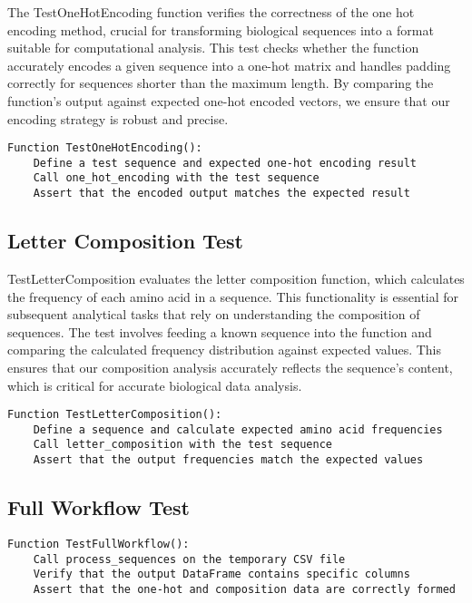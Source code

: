 \documentclass[12pt]{article}
\begin{document}
The TestOneHotEncoding function verifies the correctness of the one hot encoding method, crucial for transforming biological sequences into a format suitable for computational analysis. This test checks whether the function accurately encodes a given sequence into a one-hot matrix and handles padding correctly for sequences shorter than the maximum length. By comparing the function’s output against expected one-hot encoded vectors, we ensure that our encoding strategy is robust and precise.

\begin{lstlisting}[caption=Pseudocode: Test for One-Hot Encoding Function]
Function TestOneHotEncoding():
    Define a test sequence and expected one-hot encoding result
    Call one_hot_encoding with the test sequence
    Assert that the encoded output matches the expected result
\end{lstlisting}

\subsection{Letter Composition Test}

TestLetterComposition evaluates the letter composition function, which calculates the frequency of each amino acid in a sequence. This functionality is essential for subsequent analytical tasks that rely on understanding the composition of sequences. The test involves feeding a known sequence into the function and comparing the calculated frequency distribution against expected values. This ensures that our composition analysis accurately reflects the sequence's content, which is critical for accurate biological data analysis.

\begin{lstlisting}[caption=Pseudocode: Test for Letter Composition Calculation]
Function TestLetterComposition():
    Define a sequence and calculate expected amino acid frequencies
    Call letter_composition with the test sequence
    Assert that the output frequencies match the expected values
\end{lstlisting}

\subsection{Full Workflow Test}
\begin{lstlisting}[caption=Pseudocode: Test for Full Processing Workflow]
Function TestFullWorkflow():
    Call process_sequences on the temporary CSV file
    Verify that the output DataFrame contains specific columns
    Assert that the one-hot and composition data are correctly formed
\end{lstlisting}
\end{document}
